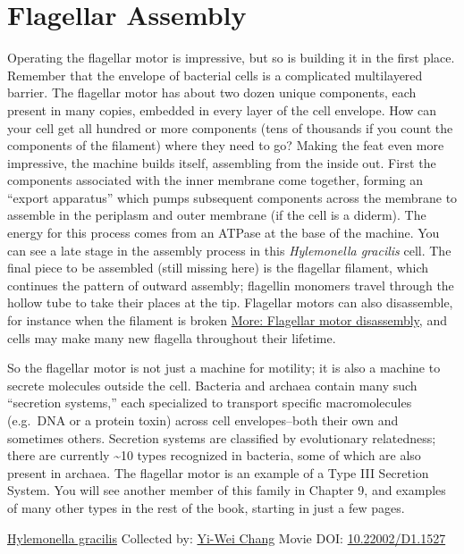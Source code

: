 \documentclass[]{tufte-book}
\begin{document}
\hypertarget{flagellar-assembly}{%
\section{Flagellar Assembly}\label{flagellar-assembly}}

Operating the flagellar motor is impressive, but so is building it in the first place. Remember that the envelope of bacterial cells is a complicated multilayered barrier. The flagellar motor has about two dozen unique components, each present in many copies, embedded in every layer of the cell envelope. How can your cell get all hundred or more components (tens of thousands if you count the components of the filament) where they need to go? Making the feat even more impressive, the machine builds itself, assembling from the inside out. First the components associated with the inner membrane come together, forming an ``export apparatus'' which pumps subsequent components across the membrane to assemble in the periplasm and outer membrane (if the cell is a diderm). The energy for this process comes from an ATPase at the base of the machine. You can see a late stage in the assembly process in this \emph{Hylemonella gracilis} cell. The final piece to be assembled (still missing here) is the flagellar filament, which continues the pattern of outward assembly; flagellin monomers travel through the hollow tube to take their places at the tip. Flagellar motors can also disassemble, for instance when the filament is broken \protect\hyperlink{Flagellar_motor_disassembly}{More: Flagellar motor disassembly}, and cells may make many new flagella throughout their lifetime.

So the flagellar motor is not just a machine for motility; it is also a machine to secrete molecules outside the cell. Bacteria and archaea contain many such ``secretion systems,'' each specialized to transport specific macromolecules (e.g.~DNA or a protein toxin) across cell envelopes--both their own and sometimes others. Secretion systems are classified by evolutionary relatedness; there are currently \textasciitilde{}10 types recognized in bacteria, some of which are also present in archaea. The flagellar motor is an example of a Type III Secretion System. You will see another member of this family in Chapter 9, and examples of many other types in the rest of the book, starting in just a few pages.



\hypertarget{htmlwidget-6114cfd405ca765c08c9}{}

\label{fig:6-3}\protect\hyperlink{tree}{Hylemonella gracilis} Collected by: \protect\hyperlink{yi-wei_chang}{Yi-Wei Chang} Movie DOI: \href{https://doi.org/10.22002/D1.1527}{10.22002/D1.1527}
\end{document}
